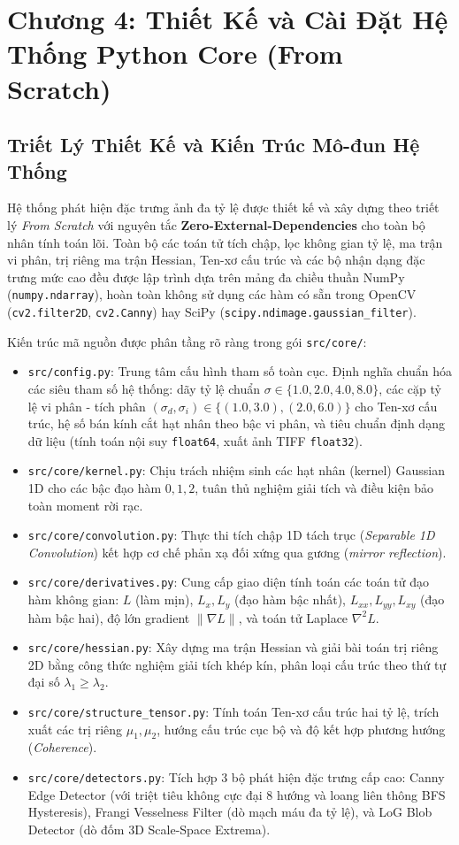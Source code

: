 \section{Chương 4: Thiết Kế và Cài Đặt Hệ Thống Python Core (From Scratch)}

\subsection{Triết Lý Thiết Kế và Kiến Trúc Mô-đun Hệ Thống}
Hệ thống phát hiện đặc trưng ảnh đa tỷ lệ được thiết kế và xây dựng theo triết lý \textit{From Scratch} với nguyên tắc \textbf{Zero-External-Dependencies} cho toàn bộ nhân tính toán lõi. Toàn bộ các toán tử tích chập, lọc không gian tỷ lệ, ma trận vi phân, trị riêng ma trận Hessian, Ten-xơ cấu trúc và các bộ nhận dạng đặc trưng mức cao đều được lập trình dựa trên mảng đa chiều thuần NumPy (\texttt{numpy.ndarray}), hoàn toàn không sử dụng các hàm có sẵn trong OpenCV (\texttt{cv2.filter2D}, \texttt{cv2.Canny}) hay SciPy (\texttt{scipy.ndimage.gaussian\_filter}).

Kiến trúc mã nguồn được phân tầng rõ ràng trong gói \texttt{src/core/}:
\begin{itemize}
    \item \texttt{src/config.py}: Trung tâm cấu hình tham số toàn cục. Định nghĩa chuẩn hóa các siêu tham số hệ thống: dãy tỷ lệ chuẩn $\sigma \in \{1.0, 2.0, 4.0, 8.0\}$, các cặp tỷ lệ vi phân - tích phân $(\sigma_d, \sigma_i) \in \{(1.0, 3.0), (2.0, 6.0)\}$ cho Ten-xơ cấu trúc, hệ số bán kính cắt hạt nhân theo bậc vi phân, và tiêu chuẩn định dạng dữ liệu (tính toán nội suy \texttt{float64}, xuất ảnh TIFF \texttt{float32}).
    \item \texttt{src/core/kernel.py}: Chịu trách nhiệm sinh các hạt nhân (kernel) Gaussian 1D cho các bậc đạo hàm $0, 1, 2$, tuân thủ nghiệm giải tích và điều kiện bảo toàn moment rời rạc.
    \item \texttt{src/core/convolution.py}: Thực thi tích chập 1D tách trục (\textit{Separable 1D Convolution}) kết hợp cơ chế phản xạ đối xứng qua gương (\textit{mirror reflection}).
    \item \texttt{src/core/derivatives.py}: Cung cấp giao diện tính toán các toán tử đạo hàm không gian: $L$ (làm mịn), $L_x, L_y$ (đạo hàm bậc nhất), $L_{xx}, L_{yy}, L_{xy}$ (đạo hàm bậc hai), độ lớn gradient $\|\nabla L\|$, và toán tử Laplace $\nabla^2 L$.
    \item \texttt{src/core/hessian.py}: Xây dựng ma trận Hessian và giải bài toán trị riêng 2D bằng công thức nghiệm giải tích khép kín, phân loại cấu trúc theo thứ tự đại số $\lambda_1 \ge \lambda_2$.
    \item \texttt{src/core/structure\_tensor.py}: Tính toán Ten-xơ cấu trúc hai tỷ lệ, trích xuất các trị riêng $\mu_1, \mu_2$, hướng cấu trúc cục bộ và độ kết hợp phương hướng (\textit{Coherence}).
    \item \texttt{src/core/detectors.py}: Tích hợp 3 bộ phát hiện đặc trưng cấp cao: Canny Edge Detector (với triệt tiêu không cực đại 8 hướng và loang liên thông BFS Hysteresis), Frangi Vesselness Filter (dò mạch máu đa tỷ lệ), và LoG Blob Detector (dò đốm 3D Scale-Space Extrema).
\end{itemize}

